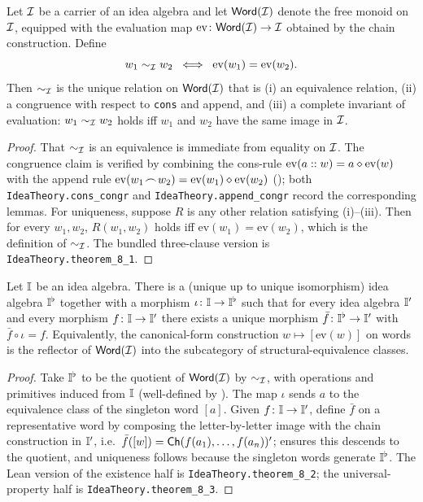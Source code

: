 \begin{theorem}\label{thm:kernel}
Let $\mathcal{I}$ be a carrier of an idea algebra and let
$\mathsf{Word}(\mathcal{I})$ denote the free monoid on $\mathcal{I}$, equipped
with the evaluation map $\mathrm{ev}\colon\mathsf{Word}(\mathcal{I})\to
\mathcal{I}$ obtained by the chain construction. Define
\[
  w_1 \sim_{\mathcal{I}} w_2 \;\iff\; \mathrm{ev}(w_1) = \mathrm{ev}(w_2).
\]
Then $\sim_{\mathcal{I}}$ is the unique relation on $\mathsf{Word}(\mathcal{I})$
that is (i) an equivalence relation, (ii) a congruence with respect to
\texttt{cons} and append, and (iii) a complete invariant of evaluation:
$w_1\sim_{\mathcal{I}} w_2$ holds iff $w_1$ and $w_2$ have the same image in
$\mathcal{I}$.
\end{theorem}

\begin{proof}
That $\sim_{\mathcal{I}}$ is an equivalence is immediate from equality on
$\mathcal{I}$. The congruence claim is verified by combining the cons-rule
$\mathrm{ev}(a::w) = a\mathbin{\diamond}\mathrm{ev}(w)$ with the append rule
$\mathrm{ev}(w_1\!\frown\!w_2) = \mathrm{ev}(w_1)\mathbin{\diamond}
\mathrm{ev}(w_2)$ (); both
\texttt{IdeaTheory.cons\_congr} and \texttt{IdeaTheory.append\_congr}
record the corresponding lemmas. For uniqueness, suppose $R$ is any
other relation satisfying (i)--(iii). Then for every $w_1,w_2$,
$R(w_1,w_2)$ holds iff $\mathrm{ev}(w_1)=\mathrm{ev}(w_2)$, which is
the definition of $\sim_{\mathcal{I}}$. The bundled three-clause version is
\texttt{IdeaTheory.theorem\_8\_1}.
\end{proof}

\begin{theorem}\label{thm:universal}
Let $\mathbb{I}$ be an idea algebra. There is a (unique up to unique
isomorphism) idea algebra $\mathbb{I}^{\flat}$ together with a morphism
$\iota\colon\mathbb{I}\to\mathbb{I}^{\flat}$ such that for every idea
algebra $\mathbb{I}'$ and every morphism $f\colon\mathbb{I}\to\mathbb{I}'$
there exists a unique morphism
$\bar f\colon\mathbb{I}^{\flat}\to\mathbb{I}'$ with $\bar f\circ\iota = f$.
Equivalently, the canonical-form construction $w\mapsto[\mathrm{ev}(w)]$
on words is the reflector of $\mathsf{Word}(\mathcal{I})$ into the
subcategory of structural-equivalence classes.
\end{theorem}

\begin{proof}
Take $\mathbb{I}^{\flat}$ to be the quotient of $\mathsf{Word}(\mathcal{I})$
by $\sim_{\mathcal{I}}$, with operations and primitives induced from
$\mathbb{I}$ (well-defined by ). The map $\iota$ sends
$a$ to the equivalence class of the singleton word $[a]$. Given
$f\colon\mathbb{I}\to\mathbb{I}'$, define $\bar f$ on a representative
word by composing the letter-by-letter image with the chain
construction in $\mathbb{I}'$, i.e.\ $\bar f([w]) =
\mathsf{Ch}(f(a_1),\dots,f(a_n))'$;  ensures this
descends to the quotient, and uniqueness follows because the singleton
words generate $\mathbb{I}^{\flat}$. The Lean version of the existence
half is \texttt{IdeaTheory.theorem\_8\_2}; the universal-property half
is \texttt{IdeaTheory.theorem\_8\_3}.
\end{proof}

